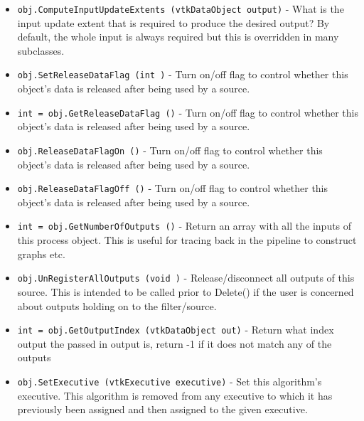 \begin{itemize}
\item  \verb|obj.ComputeInputUpdateExtents (vtkDataObject output)| -  What is the input update extent that is required to produce the
 desired output? By default, the whole input is always required but
 this is overridden in many subclasses. 

\item  \verb|obj.SetReleaseDataFlag (int )| -  Turn on/off flag to control whether this object's data is released
 after being used by a source.

\item  \verb|int = obj.GetReleaseDataFlag ()| -  Turn on/off flag to control whether this object's data is released
 after being used by a source.

\item  \verb|obj.ReleaseDataFlagOn ()| -  Turn on/off flag to control whether this object's data is released
 after being used by a source.

\item  \verb|obj.ReleaseDataFlagOff ()| -  Turn on/off flag to control whether this object's data is released
 after being used by a source.

\item  \verb|int = obj.GetNumberOfOutputs ()| -  Return an array with all the inputs of this process object.
 This is useful for tracing back in the pipeline to construct
 graphs etc.

\item  \verb|obj.UnRegisterAllOutputs (void )| -  Release/disconnect all outputs of this source. This is intended to be
 called prior to Delete() if the user is concerned about outputs holding
 on to the filter/source.

\item  \verb|int = obj.GetOutputIndex (vtkDataObject out)| -  Return what index output the passed in output is, return -1 if it
 does not match any of the outputs

\item  \verb|obj.SetExecutive (vtkExecutive executive)| -  Set this algorithm's executive.  This algorithm is removed from
 any executive to which it has previously been assigned and then
 assigned to the given executive.

\end{itemize}
